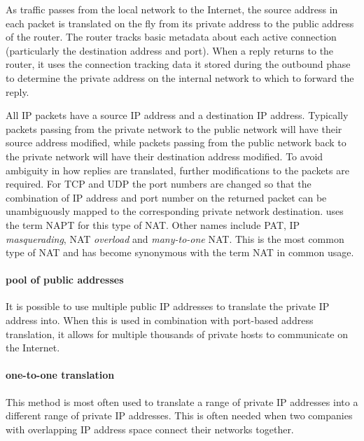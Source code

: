 As traffic passes from the local network to the Internet, the source address in each packet is translated on the fly from its private address to the public address of the router.
The router tracks basic metadata about each active connection (particularly the destination address and port).
When a reply returns to the router, it uses the connection tracking data it stored during the outbound phase to determine the private address on the internal network to which to forward the reply.

All \acs{IP} packets have a source \acs{IP} address and a destination \acs{IP} address.
Typically packets passing from the private network to the public network will have their source address modified, while packets passing from the public network back to the private network will have their destination address modified.
To avoid ambiguity in how replies are translated, further modifications to the packets are required.
For \acs{TCP} and \acs{UDP} the port numbers are changed so that the combination of \acs{IP} address and port number on the returned packet can be unambiguously mapped to the corresponding private network destination.
 uses the term \gls{NAPT} for this type of \acs{NAT}.
Other names include \gls{PAT}, \acs{IP} \emph{masquerading}, \acs{NAT} \emph{overload} and \emph{many-to-one} \acs{NAT}.
This is the most common type of \acs{NAT} and has become synonymous with the term \acs{NAT} in common usage.

\paragraph{pool of public addresses}
It is possible to use multiple public \acs{IP} addresses to translate the private \acs{IP} address into.
When this is used in combination with port-based address translation, it allows for multiple thousands of private hosts to communicate on the Internet.

\paragraph{one-to-one translation}
This method is most often used to translate a range of private \acs{IP} addresses into a different range of private \acs{IP} addresses.
This is often needed when two companies with overlapping \acs{IP} address space connect their networks together.




